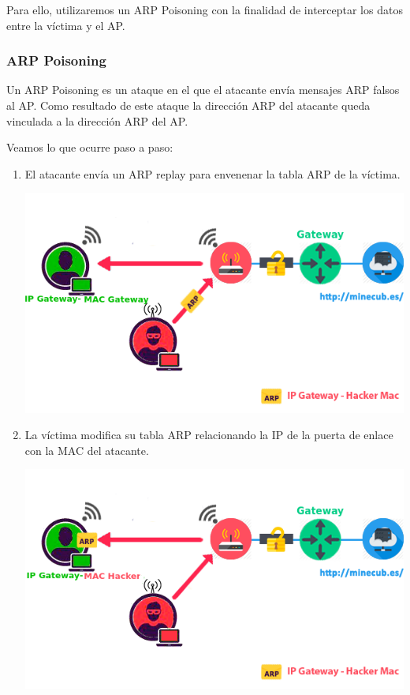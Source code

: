 Para ello, utilizaremos un ARP Poisoning con la finalidad de interceptar los datos entre la víctima y el AP.

\subsubsection{ARP Poisoning}
Un ARP Poisoning es un ataque en el que el atacante envía mensajes ARP falsos al AP. Como resultado de este ataque la dirección ARP del atacante queda vinculada a la dirección ARP del AP.

Veamos lo que ocurre paso a paso:
\begin{enumerate}
	\item El atacante envía un ARP replay para envenenar la tabla ARP de la víctima.
	\begin{center}
		\includegraphics[scale=0.7]{ARPpoison1.png}
	\end{center}
\newpage
	\item La víctima modifica su tabla ARP relacionando la IP de la puerta de enlace con la MAC del atacante.
	\begin{center}
		\includegraphics[scale=0.7]{ARPpoison2.png}
	\end{center}
\end{enumerate}

